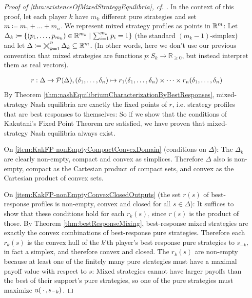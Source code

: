 \documentclass[a4paper]{scrreprt}
\newcommand{\Rp}{\mathbb{R}_{\geq 0}}
\begin{document}
    \begin{proof}[Proof of \ref{thm:existenceOfMixedStrategyEquilibria}, cf. {\cite[p.29]{bib:fudenbergGameTheory}}]
        In the context of this proof, let each player $k$ have $m_k$ different pure strategies and set $m \coloneqq m_1 + \dots + m_n$.
        We represent mixed strategy profiles as points in $\mathbb{R}^m$: Let $\Delta_k \coloneqq \{(p_1, \dots, p_{m_k}) \in \mathbb{R}^{m_k} \mid \sum_{i=1}^{m_k} p_i = 1\}$ (the standard $(m_k - 1)$-simplex) and let $\Delta \coloneqq \bigtimes_{k=1}^n \Delta_k \subseteq \mathbb{R}^m$. (In other words, here we don't use our previous convention that mixed strategies are functions $p: S_k \to \Rp$, but instead interpret them as real vectors).
        
        \begin{gather}
            r: \Delta \to \operatorname{\mathcal{P}}(\Delta), (\delta_1, \dots, \delta_n) \mapsto r_1(\delta_1, \dots, \delta_n) \times \dots \times r_n(\delta_1, \dots, \delta_n)
            \label{eq:bestResponseCorresponenceDefinition}
        \end{gather}
        By Theorem \ref{thm:nashEquilibriumCharacterizationByBestResponses}, mixed-strategy Nash equilibria are exactly the fixed points of $r$, i.e. strategy profiles that are best responses to themselves: So if we show that the conditions of Kakutani's Fixed Point Theorem are satisfied, we have proven that mixed-strategy Nash equilibria always exist.
        
        On \ref{item:KakFP-nonEmptyCompactConvexDomain} (conditions on $\Delta$): The $\Delta_k$ are clearly non-empty, compact and convex as simplices. Therefore $\Delta$ also is non-empty,
        compact as the Cartesian product of compact sets, and convex as the Cartesian product of convex sets. %
        
        On \ref{item:KakFP-nonEmptyConvexClosedOutputs} (the set $r(s)$ of best-response profiles is non-empty, convex and closed for all $s \in \Delta$): It suffices to show that these conditions hold for each $r_k(s)$, since $r(s)$ is the product of those. By Theorem \ref{thm:bestResponseMixing}, best-response mixed strategies are exactly the convex combinations of best-response pure strategies. Therefore each $r_k(s)$ is the convex hull of the $k$'th player's best response pure strategies to $s_{-k}$, in fact a simplex, and therefore convex and closed. The $r_k(s)$ are non-empty because at least one of the finitely many pure strategies must have a maximal payoff value with respect to $s$: Mixed strategies cannot have larger payoffs than the best of their support's pure strategies, so one of the pure strategies must maximize $u(\,\cdot\,, s_{-k})$.
        

\end{proof}
\end{document}
